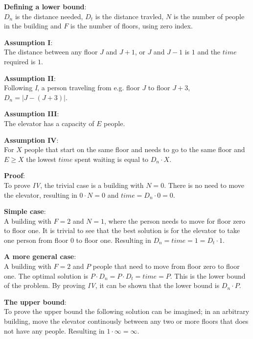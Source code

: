 
\textbf{Defining a lower bound}:
\\
$ D_n $ is the distance needed, $ D_t $ is the distance travled, $ N $ is the number of people in the building and $ F $ is the number of floors, using zero index.

\textbf{Assumption I}:
\\
The distance between any floor $ J $ and $ J + 1 $, or  $ J $ and $ J - 1 $ is $ 1 $ and the $ time $ required is $ 1 $.

\textbf{Assumption II}:
\\
Following \textit{I}, a person traveling from e.g. floor $ J $ to floor $ J + 3 $, $ D_n = |J - ( J + 3)|$.

\textbf{Assumption III}:
\\
The elevator has a capacity of $ E $ people.

\textbf{Assumption IV}:
\\
For $ X $ people that start on the same floor and needs to go to the same floor and $ E \geq X $ the lowest $ time $ spent waiting is equal to $ D_n \cdot X $.

\textbf{Proof}:
\\
To prove \textit{IV}, the trivial case is a building with $ N = 0 $. There is no need to move the elevator, resulting in $ 0 \cdot N = 0 $ and $ time = D_n \cdot 0 = 0 $.

\textbf{Simple case}:
\\
A building with $ F = 2 $ and $ N = 1 $, where the person needs to move for floor zero to floor one. It is trivial to see that the best solution is for the elevator to take one person from floor 0 to floor one. Resulting in $ D_n = time = 1 = D_t \cdot 1 $.

\textbf{A more general case}:
\\
A building with $ F = 2 $ and $ P $ people that need to move from floor zero to floor one. The optimal solution is $ P \cdot D_n = P \cdot D_t = time = P $. This is the lower bound of the problem. By proving \textit{IV}, it can be shown that the lower bound is $ D_n \cdot P $.

\textbf{The upper bound}:
\\
To prove the upper bound the following solution can be imagined; in an arbitrary building, move the elevator continously between any two or more floors that does not have any people. Resulting in $ 1 \cdot \infty = \infty $.
